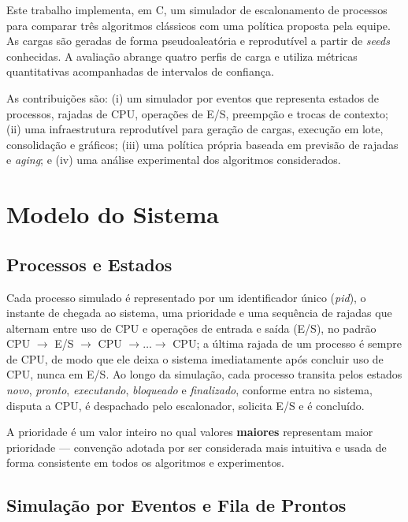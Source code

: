 \documentclass[conference]{IEEEtran}
\begin{document}
Este trabalho implementa, em C, um simulador de escalonamento de processos para comparar três algoritmos clássicos com uma política proposta pela equipe. As cargas são geradas de forma pseudoaleatória e reprodutível a partir de \textit{seeds} conhecidas. A avaliação abrange quatro perfis de carga e utiliza métricas quantitativas acompanhadas de intervalos de confiança.

As contribuições são: (i) um simulador por eventos que representa estados de processos, rajadas de CPU, operações de E/S, preempção e trocas de contexto; (ii) uma infraestrutura reprodutível para geração de cargas, execução em lote, consolidação e gráficos; (iii) uma política própria baseada em previsão de rajadas e \textit{aging}; e (iv) uma análise experimental dos algoritmos considerados.

\section{Modelo do Sistema}
\label{sec:modelo-sistema}

\subsection{Processos e Estados}

Cada processo simulado é representado por um identificador único (\textit{pid}), o instante de chegada ao sistema, uma prioridade e uma sequência de rajadas que alternam entre uso de CPU e operações de entrada e saída (E/S), no padrão CPU $\rightarrow$ E/S $\rightarrow$ CPU $\rightarrow \dots \rightarrow$ CPU; a última rajada de um processo é sempre de CPU, de modo que ele deixa o sistema imediatamente após concluir uso de CPU, nunca em E/S. Ao longo da simulação, cada processo transita pelos estados \textit{novo}, \textit{pronto}, \textit{executando}, \textit{bloqueado} e \textit{finalizado}, conforme entra no sistema, disputa a CPU, é despachado pelo escalonador, solicita E/S e é concluído.

A prioridade é um valor inteiro no qual valores \textbf{maiores} representam maior prioridade — convenção adotada por ser considerada mais intuitiva e usada de forma consistente em todos os algoritmos e experimentos.

\subsection{Simulação por Eventos e Fila de Prontos}
\end{document}

